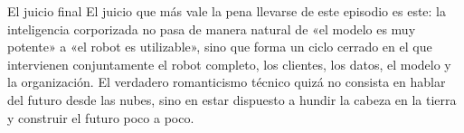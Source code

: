 \begin{importantbox}{El juicio final}
El juicio que más vale la pena llevarse de este episodio es este: la inteligencia corporizada no pasa de manera natural de «el modelo es muy potente» a «el robot es utilizable», sino que forma un ciclo cerrado en el que intervienen conjuntamente el robot completo, los clientes, los datos, el modelo y la organización. El verdadero romanticismo técnico quizá no consista en hablar del futuro desde las nubes, sino en estar dispuesto a hundir la cabeza en la tierra y construir el futuro poco a poco.
\end{importantbox}


